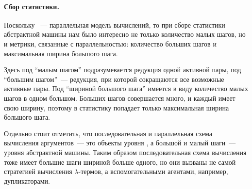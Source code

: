\paragraph{Сбор статистики.}
Поскольку \INs{}~--- параллельная модель вычислений, то при сборе статистики абстрактной машины нам было интересно не только количество малых шагов, но и метрики, связанные с параллельностью: количество больших шагов и максимальная ширина большого шага.

Здесь под \enquote{малым шагом} подразумевается редукция одной активной пары, под \enquote{большим шагом}~--- редукция, при которой сокращаются все возможные активные пары.
Под \enquote{шириной большого шага} имеется в виду количество малых шагов в одном большом.
Больших шагов совершается много, и каждый имеет свою ширину, поэтому в статистику попадает только максимальная ширина большого шага.

Отдельно стоит отметить, что последовательная и параллельная схема вычисления аргументов~--- это объекты уровня \INs{}, а большой и малый шаги~--- уровня абстрактной машины.
Таким образом последовательная схема вычисления тоже имеет большие шаги шириной больше одного, но они вызваны не самой стратегией вычисления $\lambda$-термов, а вспомогательными агентами, например, дупликаторами.

